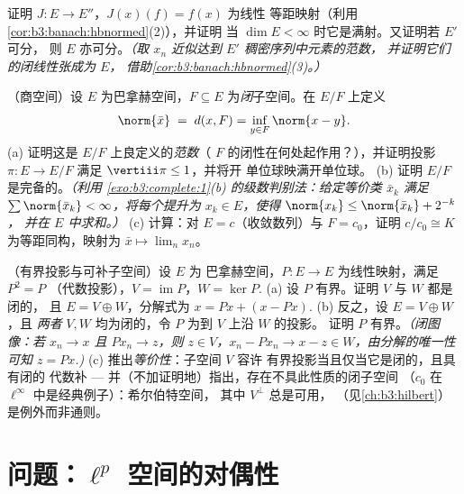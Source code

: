 \begin{exercise}[$\star\star$]\label{exo:b3:banach:10}
证明 $J \colon E \to E''$，$J(x)(f) = f(x)$ 为线性
等距映射（利用\cref{cor:b3:banach:hbnormed}(2)），并证明
当 $\dim E < \infty$ 时它是满射。又证明若 $E'$ 可分，
则 $E$ 亦可分。\emph{（取 $x_n$ 近似达到 $E'$ 稠密序列中元素的范数，
并证明它们的闭线性张成为 $E$，
借助\cref{cor:b3:banach:hbnormed}(3)。）}
\end{exercise}

\begin{exercise}[$\star\star$]\label{exo:b3:banach:11}
（商空间）设 $E$ 为巴拿赫空间，$F \subseteq
E$ 为\emph{闭}子空间。在 $E/F$ 上定义
\[
\norm{\bar x} \;=\; d(x, F) = \inf_{y\in F}\norm{x - y} .
\]
(a) 证明这是 $E/F$ 上良定义的\emph{范数}（
$F$ 的闭性在何处起作用？），并证明投影 $\pi
\colon E \to E/F$ 满足 $\vertiii\pi \leq 1$，并将开
单位球映满开单位球。
(b) 证明 $E/F$ 是完备的。\emph{（利用
\cref{exo:b3:complete:1}(b) 的级数判别法：给定等价类
$\bar x_k$ 满足 $\sum\norm{\bar x_k} < \infty$，将每个提升为
$x_k \in E$，使得 $\norm{x_k} \leq \norm{\bar x_k} + 2^{-k}$，
并在 $E$ 中求和。）}
(c) 计算：对 $E = c$（收敛数列）与 $F =
c_0$，证明 $c/c_0 \cong K$ 为等距同构，映射为 $\bar x \mapsto
\lim_nx_n$。
\end{exercise}

\begin{exercise}[$\star\star$]\label{exo:b3:banach:12}
（有界投影与可补子空间）设 $E$ 为
巴拿赫空间，$P \colon E \to E$ 为线性映射，满足 $P^2 = P$
（代数投影），$V = \operatorname{im}P$，$W =
\ker P$.
(a) 设 $P$ 有界。证明 $V$ 与 $W$ 都是闭的，
且 $E = V \oplus W$，分解式为 $x = Px + (x -
Px)$.
(b) 反之，设 $E = V \oplus W$，且 \emph{两者} $V,
W$ 均为闭的，令 $P$ 为到 $V$ 上沿 $W$ 的投影。
证明 $P$ 有界。\emph{（闭图像：若 $x_n \to x$
且 $Px_n \to z$，则 $z \in V$，$x_n - Px_n \to x - z \in
W$，由分解的唯一性可知 $z =
Px$.)}
(c) 推出\emph{等价性}：子空间 $V$ 容许
有界投影当且仅当它是闭的，且具有闭的
代数补 --- 并（不加证明地）指出，存在不具此性质的闭子空间
（$c_0$ 在
$\ell^\infty$ 中是经典例子）：希尔伯特空间，
其中 $V^\perp$ 总是可用，
（见\cref{ch:b3:hilbert}）是例外而非通则。
\end{exercise}

\section{问题：\texorpdfstring{$\ell^p$}%
{lp} 空间的对偶性}

